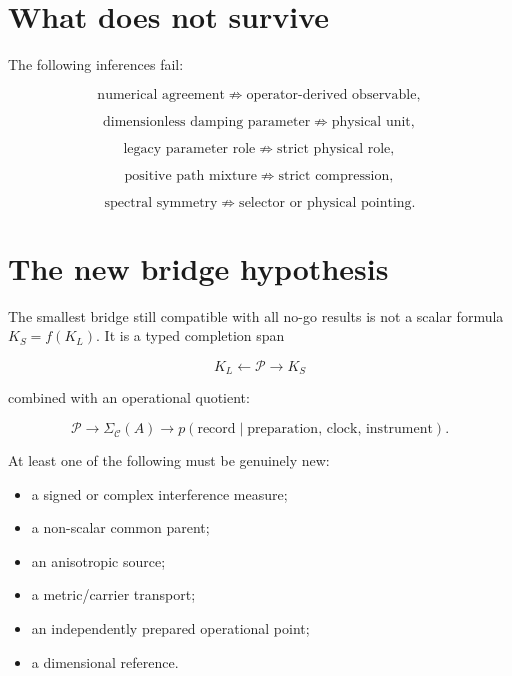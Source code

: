 \documentclass[11pt,a4paper,openany]{report}
\begin{document}
\section{What does not survive}

The following inferences fail:

\[
\text{numerical agreement}
\not\Rightarrow
\text{operator-derived observable},
\]

\[
\text{dimensionless damping parameter}
\not\Rightarrow
\text{physical unit},
\]

\[
\text{legacy parameter role}
\not\Rightarrow
\text{strict physical role},
\]

\[
\text{positive path mixture}
\not\Rightarrow
\text{strict compression},
\]

\[
\text{spectral symmetry}
\not\Rightarrow
\text{selector or physical pointing}.
\]

\section{The new bridge hypothesis}

The smallest bridge still compatible with all no-go results is not a scalar formula \(K_S=f(K_L)\). It is a typed completion span

\[
K_L\leftarrow\mathcal P\rightarrow K_S
\]

combined with an operational quotient:

\[
\mathcal P
\longrightarrow
\Sigma_{\mathcal C}(A)
\longrightarrow
p(\text{record}\mid\text{preparation, clock, instrument}).
\]

At least one of the following must be genuinely new:

\begin{itemize}
\item 
a signed or complex interference measure;

\item 
a non-scalar common parent;

\item 
an anisotropic source;

\item 
a metric/\allowbreak{}carrier transport;

\item 
an independently prepared operational point;

\item 
a dimensional reference.

\end{itemize}
\end{document}
